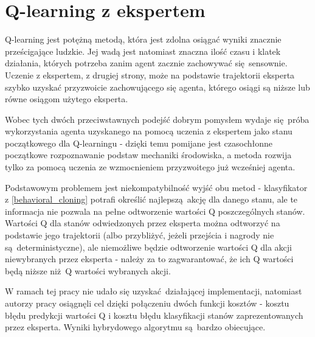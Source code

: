 \section{Q-learning z ekspertem}
Q-learning jest potężną metodą, która jest zdolna osiągać wyniki znacznie prześcigające ludzkie. Jej wadą jest natomiast znaczna ilość czasu i klatek działania, których potrzeba zanim agent zacznie zachowywać się sensownie. Uczenie z ekspertem, z drugiej strony, może na podstawie trajektorii eksperta szybko uzyskać przyzwoicie zachowującego się agenta, którego osiągi są niższe lub równe osiągom użytego eksperta.

Wobec tych dwóch przeciwstawnych podejść dobrym pomysłem wydaje się próba wykorzystania agenta uzyskanego na pomocą uczenia z ekspertem jako stanu początkowego dla Q-learningu - dzięki temu pomijane jest czasochłonne początkowe rozpoznawanie podstaw mechaniki środowiska, a metoda rozwija tylko za pomocą uczenia ze wzmocnieniem przyzwoitego już wcześniej agenta.

Podstawowym problemem jest niekompatybilność wyjść obu metod - klasyfikator z \ref{behavioral_cloning} potrafi określić najlepszą akcję dla danego stanu, ale te informacja nie pozwala na pełne odtworzenie wartości Q poszczególnych stanów. Wartości Q dla stanów odwiedzonych przez eksperta można odtworzyć na podstawie jego trajektorii (albo przybliżyć, jeżeli przejścia i nagrody nie są deterministyczne), ale niemożliwe będzie odtworzenie wartości Q dla akcji niewybranych przez eksperta - należy za to zagwarantować, że ich Q wartości będą niższe niż Q wartości wybranych akcji.

W ramach tej pracy nie udało się uzyskać działającej implementacji, natomiast autorzy pracy \cite{DBLP:journals/corr/HesterVPLSPSDOA17} osiągnęli cel dzięki połączeniu dwóch funkcji kosztów - kosztu błędu predykcji wartości Q i kosztu błędu klasyfikacji stanów zaprezentowanych przez eksperta. Wyniki hybrydowego algorytmu są bardzo obiecujące.
